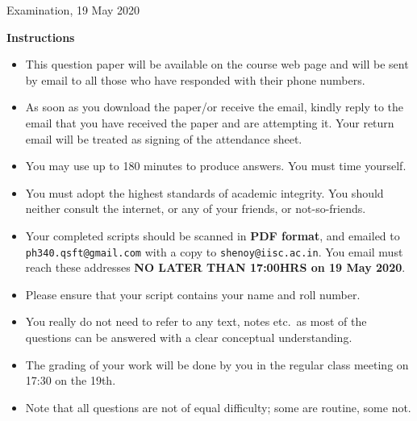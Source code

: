 \documentclass[a4paper,12pt]{article}
\begin{document}
\logo

\centerline{ \sc Examination, 19 May 2020}

\bigskip

\centerline{{\bf Instructions}}
\begin{itemize}
\item This question paper will be available on the course web page and will be sent by email to all those who have responded with their phone numbers.
\item As soon as you download the paper/or receive the email, kindly reply to the email that you have received the paper and are attempting it. Your return email will be treated as signing of the attendance sheet.
\item You may use up to 180 minutes to produce answers. You must time yourself.
\item You must adopt the highest standards of academic integrity. You should neither consult the internet, or any of your friends, or not-so-friends.
\item Your completed scripts should be scanned in {\bf PDF format}, and emailed to { \tt ph340.qsft@gmail.com} with a copy to {\tt shenoy@iisc.ac.in}. You email must reach these addresses {\bf NO LATER THAN 17:00HRS on 19 May 2020}.
\item Please ensure that your script contains your name and roll number.
\item You really do not need to refer to any text, notes etc.~as most of the questions can be answered with a clear conceptual understanding.
\item The grading of your work will be done by you in the regular class meeting on 17:30 on the 19th. 
\item Note that all questions are not of equal difficulty; some are routine, some  not.
\end{itemize}

\medskip

\noindent
\end{document}
